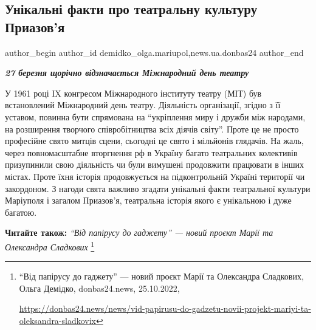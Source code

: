  
 
 
 
 
 
\subsection{Унікальні факти про театральну культуру Приазов'я}
\label{sec:27_03_2023.stz.news.ua.donbas24.1.unikalni_fakty_teatr_kultura_priazovja}
 
\ifcmt
 author_begin
   author_id demidko_olga.mariupol,news.ua.donbas24
 author_end
\fi

\begin{center}
  \em\color{blue}\bfseries\Large
  27 березня щорічно відзначається Міжнародний день театру
\end{center}


У 1961 році IX конгресом Міжнародного інституту театру (МІТ) був встановлений
Міжнародний день театру. Діяльність організації, згідно з її уставом, повинна
бути спрямована на \enquote{укріплення миру і дружби між народами, на розширення
творчого співробітництва всіх діячів світу}. Проте це не просто професійне
свято митців сцени, сьогодні це свято і мільйонів глядачів. На жаль, через
повномасштабне вторгнення рф в Україну багато театральних колективів
призупинили свою діяльність чи були вимушені продовжити працювати в інших
містах. Проте їхня історія продовжується на підконтрольній Україні території чи
закордоном. З нагоди свята важливо згадати унікальні факти театральної культури
Маріуполя і загалом Приазов'я, театральна історія якого є унікальною і дуже
багатою.

\textbf{Читайте також:} \emph{\enquote{Від папірусу до гаджету} — новий проєкт Марії та Олександра Сладкових}%
\footnote{\enquote{Від папірусу до гаджету} — новий проєкт Марії та Олександра Сладкових, Ольга Демідко, donbas24.news, 25.10.2022, \par%
\url{https://donbas24.news/news/vid-papirusu-do-gadzetu-novii-projekt-mariyi-ta-oleksandra-sladkovix}
}


